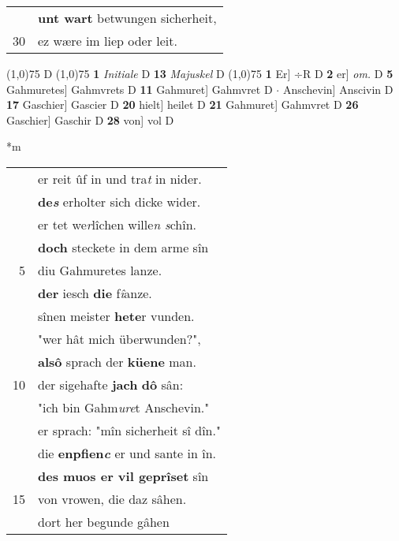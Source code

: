\documentclass[8pt,a4paper,notitlepage]{article}
\begin{document}
\begin{table}[ht]
\begin{minipage}[t]{0.5\linewidth}
\begin{tabular}{rl}
 & \textbf{unt wart} betwungen sicherheit,\\ 
30 & ez wære im liep oder leit.\\ 
\end{tabular}
\scriptsize
\line(1,0){75} \newline
D \newline
\line(1,0){75} \newline
\textbf{1} \textit{Initiale} D  \textbf{13} \textit{Majuskel} D  \newline
\line(1,0){75} \newline
\textbf{1} Er] ÷R D \textbf{2} er] \textit{om.} D \textbf{5} Gahmuretes] Gahmvrets D \textbf{11} Gahmuret] Gahmvret D  $\cdot$ Anschevin] Anscivin D \textbf{17} Gaschier] Gascier D \textbf{20} hielt] heilet D \textbf{21} Gahmuret] Gahmvret D \textbf{26} Gaschier] Gaschir D \textbf{28} von] vol D \newline
\end{minipage}
\hspace{0.5cm}
\begin{minipage}[t]{0.5\linewidth}
\small
\begin{center}*m
\end{center}
\begin{tabular}{rl}
 & er reit ûf in und tra\textit{t} in nider.\\ 
 & \textbf{de\textit{s}} erholter sich dicke wider.\\ 
 & er tet we\textit{r}lîchen wille\textit{n s}chîn.\\ 
 & \textbf{doch} steckete in dem arme sîn\\ 
5 & diu Gahmuretes lanze.\\ 
 & \textbf{der} iesch \textbf{die} f\textit{î}anze.\\ 
 & sînen meister \textbf{hete}r vunden.\\ 
 & "wer hât mich überwunden?",\\ 
 & \textbf{alsô} sprach der \textbf{küene} man.\\ 
10 & der sigehafte \textbf{jach} \textbf{dô} sân:\\ 
 & "ich bin Gahm\textit{ure}t Anschevin."\\ 
 & er sprach: "mîn sicherheit sî dîn."\\ 
 & die \textbf{enpfien\textit{c}} er und sante in în.\\ 
 & \textbf{des muos er vil geprîset} sîn\\ 
15 & von vrowen, die daz sâhen.\\ 
 & dort her begunde gâhen\\ 

\end{tabular}
\end{minipage}
\end{table}
\end{document}

